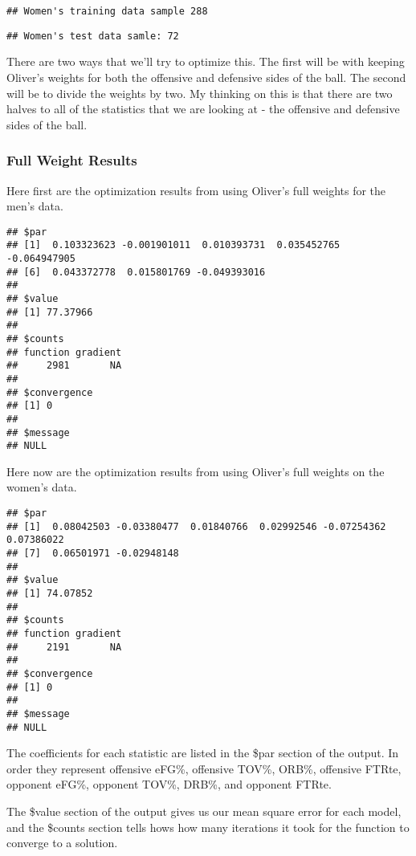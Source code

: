 \documentclass[
]{article}
\begin{document}
\begin{verbatim}
## Women's training data sample 288
\end{verbatim}

\begin{verbatim}
## Women's test data samle: 72
\end{verbatim}

There are two ways that we'll try to optimize this. The first will be
with keeping Oliver's weights for both the offensive and defensive sides
of the ball. The second will be to divide the weights by two. My
thinking on this is that there are two halves to all of the statistics
that we are looking at - the offensive and defensive sides of the ball.

\subsubsection{Full Weight Results}\label{full-weight-results}

Here first are the optimization results from using Oliver's full weights
for the men's data.

\begin{verbatim}
## $par
## [1]  0.103323623 -0.001901011  0.010393731  0.035452765 -0.064947905
## [6]  0.043372778  0.015801769 -0.049393016
## 
## $value
## [1] 77.37966
## 
## $counts
## function gradient 
##     2981       NA 
## 
## $convergence
## [1] 0
## 
## $message
## NULL
\end{verbatim}

Here now are the optimization results from using Oliver's full weights
on the women's data.

\begin{verbatim}
## $par
## [1]  0.08042503 -0.03380477  0.01840766  0.02992546 -0.07254362  0.07386022
## [7]  0.06501971 -0.02948148
## 
## $value
## [1] 74.07852
## 
## $counts
## function gradient 
##     2191       NA 
## 
## $convergence
## [1] 0
## 
## $message
## NULL
\end{verbatim}

The coefficients for each statistic are listed in the \$par section of
the output. In order they represent offensive eFG\%, offensive TOV\%,
ORB\%, offensive FTRte, opponent eFG\%, opponent TOV\%, DRB\%, and
opponent FTRte.

The \$value section of the output gives us our mean square error for
each model, and the \$counts section tells hows how many iterations it
took for the function to converge to a solution.
\end{document}
